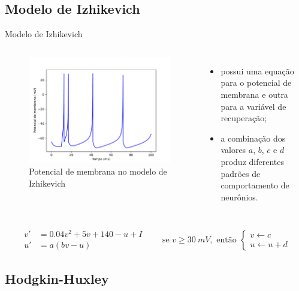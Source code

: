 \subsection{Modelo de Izhikevich}
\begin{frame}{Modelo de Izhikevich}
	\begin{columns}[t]
		\column{5cm}
			\begin{figure}[tb]
				\centering
				\caption{Potencial de membrana no modelo de Izhikevich}
				\label{fig:izhikevich}
				\includegraphics[width=0.83\linewidth]{figs/izhikevich}
			\end{figure}
		\column{5cm}
		\begin{itemize}
			\item possui uma equação para o potencial de membrana e outra para a variável de recuperação;
			\item a combinação dos valores $a$, $b$, $c$ e $d$ produz diferentes padrões de comportamento de neurônios.
		\end{itemize}
	\end{columns}
	\[
		\begin{aligned}
			v'&=0.04v^2+5v+140-u+I\\
			u'&=a(bv-u)
		\end{aligned}
		\qquad
		\text{se }v\geq30\ mV,\text{ então }\begin{cases}
			v\leftarrow c\\
			u\leftarrow u+d
		\end{cases}
	\]
\end{frame}

\subsection{Hodgkin-Huxley}
